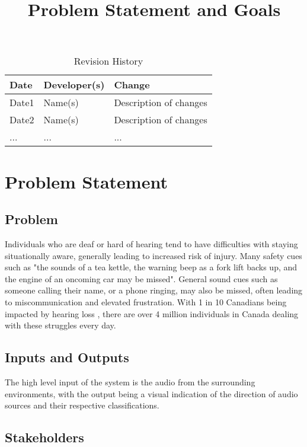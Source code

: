 \documentclass{article}
\title{Problem Statement and Goals\\\progname}
\author{\authname}
\date{}
\begin{document}
\maketitle

\begin{table}[hp]
\caption{Revision History} \label{TblRevisionHistory}
\begin{tabularx}{\textwidth}{llX}
\toprule
\textbf{Date} & \textbf{Developer(s)} & \textbf{Change}\\
\midrule
Date1 & Name(s) & Description of changes\\
Date2 & Name(s) & Description of changes\\
... & ... & ...\\
\bottomrule
\end{tabularx}
\end{table}

\section{Problem Statement}

\subsection{Problem}

Individuals who are deaf or hard of hearing tend to have difficulties with staying situationally aware, generally leading to increased risk of injury.
Many safety cues such as "the sounds of a tea kettle, the warning beep as a fork lift backs up, and the engine of an oncoming car may be missed". \cite{Masterson2016}
General sound cues such as someone calling their name, or a phone ringing, may also be missed, often leading to miscommunication and elevated frustration.
With 1 in 10 Canadians being impacted by hearing loss \cite{Healthing2025}, there are over 4 million individuals in Canada dealing with these struggles every day.


\subsection{Inputs and Outputs}

The high level input of the system is the audio from the surrounding environments, with the output
being a visual indication of the direction of audio sources and their respective classifications.

\subsection{Stakeholders}
\end{document}
